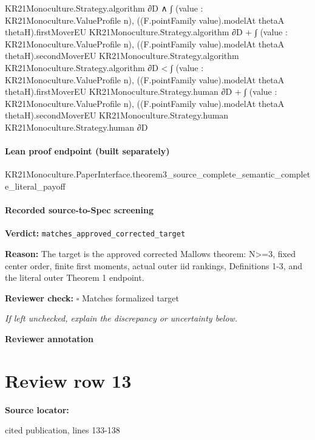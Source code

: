 \documentclass[10pt]{article}
\newcommand{\reviewerbox}{%
  \par\noindent\fbox{\parbox{0.96\linewidth}{\rule{0pt}{0.38in}}}\par
}
\newcommand{\reviewmatch}[1]{%
  \par\noindent\textbf{Reviewer check:} $\square$\; #1\par
  \noindent\emph{If left unchecked, explain the discrepancy or uncertainty below.}\par
}
\begin{document}
\begin{ReviewVerbatim}
                            KR21Monoculture.Strategy.algorithm ∂D ∧
                    ∫ (value : KR21Monoculture.ValueProfile n),
                          ((F.pointFamily value).modelAt thetaA thetaH).firstMoverEU
                            KR21Monoculture.Strategy.algorithm ∂D +
                        ∫ (value : KR21Monoculture.ValueProfile n),
                          ((F.pointFamily value).modelAt thetaA thetaH).secondMoverEU KR21Monoculture.Strategy.algorithm
                            KR21Monoculture.Strategy.algorithm ∂D <
                      ∫ (value : KR21Monoculture.ValueProfile n),
                          ((F.pointFamily value).modelAt thetaA thetaH).firstMoverEU KR21Monoculture.Strategy.human ∂D +
                        ∫ (value : KR21Monoculture.ValueProfile n),
                          ((F.pointFamily value).modelAt thetaA thetaH).secondMoverEU KR21Monoculture.Strategy.human
                            KR21Monoculture.Strategy.human ∂D
\end{ReviewVerbatim}

\paragraph{Lean proof endpoint (built separately)}\begin{ReviewVerbatim}
KR21Monoculture.PaperInterface.theorem3_source_complete_semantic_complete_literal_payoff
\end{ReviewVerbatim}

\paragraph{Recorded source-to-Spec screening}
\textbf{Verdict:} \texttt{matches\_approved\_corrected\_target}
\\
{\raggedright
\textbf{Reason:} The target is the approved corrected Mallows theorem:\allowbreak{} N>=3, fixed center order, finite first moments, actual outer iid rankings, Definitions 1-\allowbreak{}3, and the literal outer Theorem 1 endpoint.\allowbreak{}
\par}
\reviewmatch{Matches formalized target}
\noindent\textbf{Reviewer annotation}\par
\reviewerbox
\clearpage
\hypertarget{source-claim-e42fc5562761542b}{}
\section*{Review row 13}
\textbf{Source locator:} {\footnotesize\raggedright cited publication, lines 133-\allowbreak{}138\par}
\end{document}
